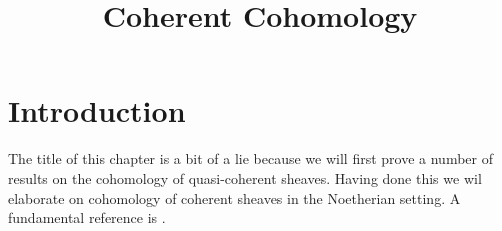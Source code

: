 

%


\title{Coherent Cohomology}


\maketitle

\tableofcontents

\section{Introduction}
\label{section-introduction}

\noindent
The title of this chapter is a bit of a lie because we
will first prove a number of results on the cohomology of quasi-coherent
sheaves. Having done this we wil elaborate on cohomology of
coherent sheaves in the Noetherian setting.
A fundamental reference is \cite{EGA}.



















